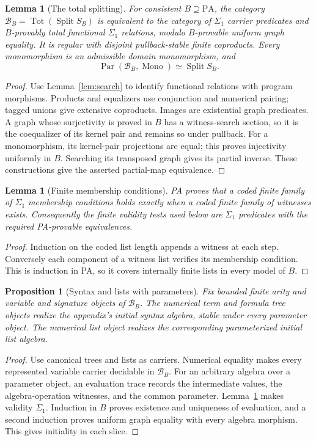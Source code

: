 \documentclass[11pt]{article}
\newtheorem{lemma}[theorem]{Lemma}
\newtheorem{proposition}[theorem]{Proposition}
\theoremstyle{definition}\newtheorem{definition}[theorem]{Definition}
\newcommand{\PA}{\mathrm{PA}}
\newcommand{\Tot}{\operatorname{Tot}}
\newcommand{\Split}{\operatorname{Split}}
\newcommand{\Par}{\operatorname{Par}}
\newcommand{\B}{\mathcal B}
\begin{document}
\begin{lemma}[The total splitting]\label{lem:total}
For consistent $B\supseteq\PA$, the category
$\B_B=\Tot(\Split S_B)$ is equivalent to the category of
$\Sigma_1$ carrier predicates and $B$-provably total functional
$\Sigma_1$ relations, modulo $B$-provable uniform graph equality.
It is regular with disjoint pullback-stable finite coproducts.
Every monomorphism is an admissible domain monomorphism, and
\[
 \Par(\B_B,\operatorname{Mono})\simeq\Split S_B.
\]
\end{lemma}
\begin{proof}
Use Lemma~\ref{lem:search} to identify functional relations with
program morphisms. Products and equalizers use conjunction and
numerical pairing; tagged unions give extensive coproducts. Images
are existential graph predicates. A graph whose surjectivity is proved
in $B$ has a witness-search section, so it is the coequalizer of its
kernel pair and remains so
under pullback. For a monomorphism, its kernel-pair projections are
equal; this proves injectivity uniformly in $B$. Searching its
transposed graph gives its partial inverse. These constructions give
the asserted partial-map equivalence.
\end{proof}

\begin{lemma}[Finite membership conditions]\label{lem:finite}
PA proves that a coded finite family of $\Sigma_1$ membership
conditions holds exactly when a coded finite family of witnesses
exists. Consequently the finite validity tests used below are
$\Sigma_1$ predicates with the required PA-provable equivalences.
\end{lemma}
\begin{proof}
Induction on the coded list length appends a witness at each step.
Conversely each component of a witness list verifies its membership
condition. This is induction in PA, so it covers internally finite
lists in every model of $B$.
\end{proof}

\begin{proposition}[Syntax and lists with parameters]\label{prop:syntax}
Fix bounded finite arity and variable and signature objects of
$\B_B$. The numerical term and formula tree objects realize the
appendix's initial syntax algebra, stable under every parameter
object. The numerical list object realizes the corresponding
parameterized initial list algebra.
\end{proposition}
\begin{proof}
Use canonical trees and lists as carriers. Numerical equality makes
every represented variable carrier decidable in $\B_B$.
For an arbitrary algebra
over a parameter object, an evaluation trace records the intermediate
values, the algebra-operation witnesses, and the common parameter.
Lemma~\ref{lem:finite} makes validity $\Sigma_1$. Induction in $B$
proves existence and uniqueness of evaluation, and a second induction
proves uniform graph equality with every algebra morphism. This gives
initiality in each slice.
\end{proof}
\end{document}
